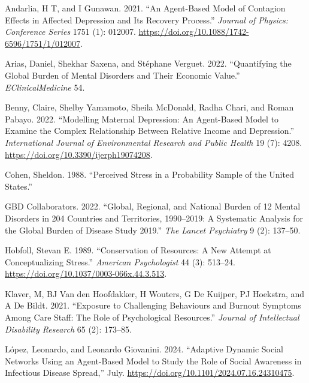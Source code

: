 \documentclass[
  letterpaper,
  DIV=11,
  numbers=noendperiod]{scrartcl}
\newlength{\cslhangindent}
\newenvironment{CSLReferences}[2] %
 {\begin{list}{}{%
  \setlength{\itemindent}{0pt}
  \setlength{\leftmargin}{0pt}
  \setlength{\parsep}{0pt}
  \ifodd #1
   \setlength{\leftmargin}{\cslhangindent}
   \setlength{\itemindent}{-1\cslhangindent}
  \fi
  \setlength{\itemsep}{#2\baselineskip}}}
 {\end{list}}
\begin{document}
\label{refs}
\begin{CSLReferences}{1}{0}
Andarlia, H T, and I Gunawan. 2021. {``An Agent-Based Model of Contagion
Effects in Affected Depression and Its Recovery Process.''}
\emph{Journal of Physics: Conference Series} 1751 (1): 012007.
\url{https://doi.org/10.1088/1742-6596/1751/1/012007}.

Arias, Daniel, Shekhar Saxena, and Stéphane Verguet. 2022.
{``Quantifying the Global Burden of Mental Disorders and Their Economic
Value.''} \emph{EClinicalMedicine} 54.

Benny, Claire, Shelby Yamamoto, Sheila McDonald, Radha Chari, and Roman
Pabayo. 2022. {``Modelling Maternal Depression: An Agent-Based Model to
Examine the Complex Relationship Between Relative Income and
Depression.''} \emph{International Journal of Environmental Research and
Public Health} 19 (7): 4208.
\url{https://doi.org/10.3390/ijerph19074208}.

Cohen, Sheldon. 1988. {``Perceived Stress in a Probability Sample of the
United States.''}

GBD Collaborators. 2022. {``Global, Regional, and National Burden of 12
Mental Disorders in 204 Countries and Territories, 1990--2019: A
Systematic Analysis for the Global Burden of Disease Study 2019.''}
\emph{The Lancet Psychiatry} 9 (2): 137--50.

Hobfoll, Stevan E. 1989. {``Conservation of Resources: A New Attempt at
Conceptualizing Stress.''} \emph{American Psychologist} 44 (3): 513--24.
\url{https://doi.org/10.1037/0003-066x.44.3.513}.

Klaver, M, BJ Van den Hoofdakker, H Wouters, G De Kuijper, PJ Hoekstra,
and A De Bildt. 2021. {``Exposure to Challenging Behaviours and Burnout
Symptoms Among Care Staff: The Role of Psychological Resources.''}
\emph{Journal of Intellectual Disability Research} 65 (2): 173--85.

López, Leonardo, and Leonardo Giovanini. 2024. {``Adaptive Dynamic
Social Networks Using an Agent-Based Model to Study the Role of Social
Awareness in Infectious Disease Spread,''} July.
\url{https://doi.org/10.1101/2024.07.16.24310475}.


\end{CSLReferences}
\end{document}
